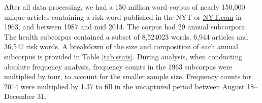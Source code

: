     After all data processing, we had a 150 million word corpus of nearly 150,000 unique articles containing a risk word published in the NYT or \url{NYT.com} in 1963, and between 1987 and mid 2014. The corpus had 29 annual subcorpora. The health subcorpus contained a subset of 8,524023 words, 6,944 articles and 36,547 risk words. A breakdown of the size and composition of each annual subcorpus is provided in Table \ref{tab:stats}. During analysis, when conducting absolute frequency analysis, frequency counts in the 1963 subcorpus were multiplied by four, to account for the smaller sample size. Frequency counts for 2014 were multiplied by 1.37 to fill in the uncaptured period between August 18--December 31.

    \begin{table}
        \centering
        \footnotesize
    \begin{tabular}{p{1.5cm}rrr}


\end{tabular}
\end{table}
